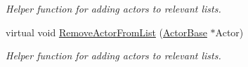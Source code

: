 \begin{DoxyCompactItemize}
\begin{DoxyCompactList}\small\item\em Helper function for adding actors to relevant lists. \item\end{DoxyCompactList}\item 
\hypertarget{classphys_1_1AreaEffect_a98bf156da3c7f8bb98d5ce9d37b6aa0f}{
virtual void \hyperlink{classphys_1_1AreaEffect_a98bf156da3c7f8bb98d5ce9d37b6aa0f}{RemoveActorFromList} (\hyperlink{classphys_1_1ActorBase}{ActorBase} $\ast$Actor)}
\label{classphys_1_1AreaEffect_a98bf156da3c7f8bb98d5ce9d37b6aa0f}

\begin{DoxyCompactList}\small\item\em Helper function for adding actors to relevant lists. \item\end{DoxyCompactList}\end{DoxyCompactItemize}
